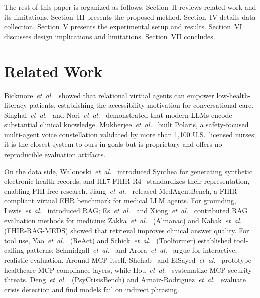 \documentclass[conference]{IEEEtran}
\begin{document}
The rest of this paper is organized as follows.
Section~II reviews related work and its limitations.
Section~III presents the proposed method.
Section~IV details data collection.
Section~V presents the experimental setup and results.
Section~VI discusses design implications and limitations.
Section~VII concludes.

\section{Related Work}
Bickmore~\textit{et~al.}~\cite{bickmore2010relational} showed that relational virtual agents can empower low-health-literacy patients, establishing the accessibility motivation for conversational care.
Singhal~\textit{et~al.}~\cite{singhal2023medpalm} and Nori~\textit{et~al.}~\cite{nori2023gpt4medicine} demonstrated that modern LLMs encode substantial clinical knowledge.
Mukherjee~\textit{et~al.}~\cite{mukherjee2024polaris} built Polaris, a safety-focused multi-agent voice constellation validated by more than 1{,}100 U.S.\ licensed nurses; it is the closest system to ours in goals but is proprietary and offers no reproducible evaluation artifacts.

On the data side, Walonoski~\textit{et~al.}~\cite{walonoski2018synthea} introduced Synthea for generating synthetic electronic health records, and HL7 FHIR R4~\cite{hl7fhirr4,mandl2016fhir} standardizes their representation, enabling PHI-free research.
Jiang~\textit{et~al.}~\cite{jiang2025medagentbench} released MedAgentBench, a FHIR-compliant virtual EHR benchmark for medical LLM agents.
For grounding, Lewis~\textit{et~al.}~\cite{lewis2020rag} introduced RAG; Es~\textit{et~al.}~\cite{es2023ragas} and Xiong~\textit{et~al.}~\cite{xiong2024medicalrag} contributed RAG evaluation methods for medicine; Zakka~\textit{et~al.}~\cite{zakka2024almanac} (Almanac) and Kabak~\textit{et~al.}~\cite{kabak2026fhirragmeds} (FHIR-RAG-MEDS) showed that retrieval improves clinical answer quality.
For tool use, Yao~\textit{et~al.}~\cite{yao2023react} (ReAct) and Schick~\textit{et~al.}~\cite{schick2023toolformer} (Toolformer) established tool-calling patterns; Schmidgall~\textit{et~al.}~\cite{schmidgall2024agentclinic} and Arora~\textit{et~al.}~\cite{arora2025healthbench} argue for interactive, realistic evaluation.
Around MCP itself, Shehab~\cite{shehab2025agenticai} and ElSayed~\textit{et~al.}~\cite{elsayed2025mcpai} prototype healthcare MCP compliance layers, while Hou~\textit{et~al.}~\cite{hou2025mcplandscape} systematize MCP security threats.
Deng~\textit{et~al.}~\cite{deng2025psycrisisbench} (PsyCrisisBench) and Arnaiz-Rodriguez~\textit{et~al.}~\cite{arnaiz2026crisis} evaluate crisis detection and find models fail on indirect phrasing.
\end{document}
